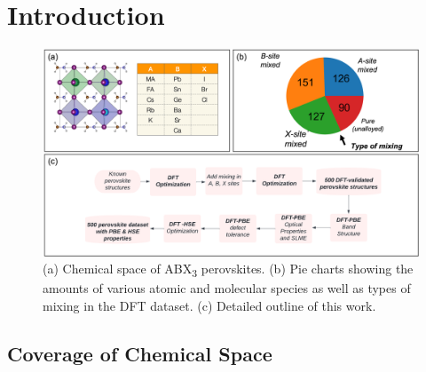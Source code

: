 \documentclass[twoside, twocolumn, 9pt, draft]{article}
\begin{document}
\renewcommand*\rmdefault{bch}\normalfont\upshape
\rmfamily
\section*{}
\vspace{-1cm}



\section*{Introduction}
\label{sec:org57d5735}
\begin{figure}
\centering
\includegraphics[h,width=.9\linewidth]{Figure1.png}
\caption{\label{Fig:outline} (a) Chemical space of ABX\textsubscript{3} perovskites. (b) Pie charts showing the amounts of various atomic and molecular species as well as types of mixing in the DFT dataset. (c) Detailed outline of this work.}
\end{figure}

\subsection*{Coverage of Chemical Space}
\label{sec:org389cc7c}
\end{document}
